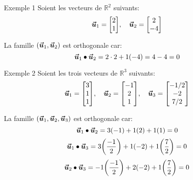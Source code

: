 \documentclass[a4paper]{article}
\begin{document}
\begin{parag}{Exemple 1}
    Soient les vecteurs de $\mathbb{R}^2$ suivants:
    \[\bvec{u}_1 = \begin{bmatrix} 2 \\ 1 \end{bmatrix}, \mathspace \bvec{u}_2 = \begin{bmatrix} 2 \\ -4 \end{bmatrix} \]

    La famille $\left(\bvec{u}_1, \bvec{u}_2\right)$ est orthogonale car:
    \[\bvec{u}_1 \dotprod \bvec{u}_2 = 2\cdot 2 + 1\left(-4\right) = 4 - 4 = 0\]
\end{parag}

\begin{parag}{Exemple 2}
    Soient les trois vecteurs de $\mathbb{R}^3$ suivants:
    \[\bvec{u}_1 = \begin{bmatrix} 3 \\ 1 \\ 1 \end{bmatrix}, \mathspace \bvec{u}_2 = \begin{bmatrix} -1 \\ 2 \\ 1 \end{bmatrix}, \mathspace \bvec{u}_3 = \begin{bmatrix} -1 / 2 \\ -2 \\ 7 / 2 \end{bmatrix} \]

    La famille $\left(\bvec{u}_1, \bvec{u}_2, \bvec{u}_3\right)$ est orthogonale car:
    \[\bvec{u}_1 \dotprod \bvec{u}_2 = 3\left(-1\right) + 1\left(2\right) + 1\left(1\right) = 0\]
    \[\bvec{u}_1 \dotprod \bvec{u}_3 = 3\left( \frac{-1}{2}\right) + 1\left(-2\right) + 1\left(\frac{7}{2}\right) = 0\]
    \[\bvec{u}_2 \dotprod \bvec{u}_3 = -1\left(\frac{-1}{2}\right) + 2\left(-2\right) + 1\left(\frac{7}{2}\right) = 0\]

\end{parag}
\end{document}
